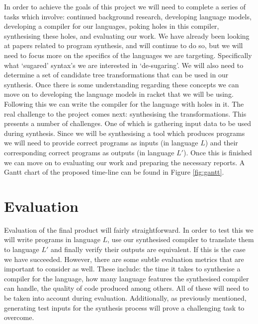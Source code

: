\documentclass[twoside]{article}
\begin{document}
\begin{multicols}{2}
In order to achieve the goals of this project we will need to complete
a series of tasks which involve: continued background research,
developing language models, developing a compiler for our languages,
poking holes in this compiler, synthesising these holes, and
evaluating our work. We have already been looking at papers related to
program synthesis, and will continue to do so, but we will need to
focus more on the specifics of the languages we are
targeting. Specifically what `sugared' syntax's we are interested in
`de-sugaring'. We will also need to determine a set of candidate tree
transformations that can be used in our synthesis. Once there is some
understanding regarding these concepts we can move on to developing
the language models in racket that we will be using. Following this we
can write the compiler for the language with holes in it. The real
challenge to the project comes next: synthesising the
transformations. This presents a number of challenges. One of which is
gathering input data to be used during synthesis. Since we will be
synthesising a tool which produces programs we will need to provide
correct programs as inputs (in language $L$) and their corresponding
correct programs as outputs (in language $L'$). Once this is finished
we can move on to evaluating our work and preparing the necessary
reports. A Gantt chart of the proposed time-line can be found in
Figure \ref{fig:gantt}.  

\section{Evaluation}
Evaluation of the final product will fairly straightforward. In order
to test this we will write programs in language $L$, use our
synthesised compiler to translate them to language $L'$ and finally
verify their outputs are equivalent. If this is the case we have
succeeded. However, there are some subtle evaluation metrics that are
important to consider as well. These include: the time it takes to
synthesise a compiler for the language, how many language features the
synthesised compiler can handle, the quality of code produced among
others. All of these will need to be taken into account during
evaluation. Additionally, as previously mentioned, generating test
inputs for the synthesis process will prove a challenging task to
overcome. 



{}



\end{multicols}
\end{document}
